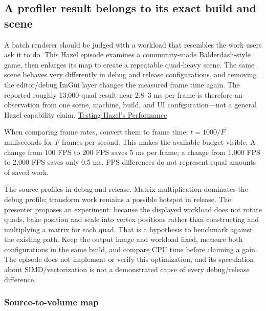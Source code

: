 \subsection{A profiler result belongs to its exact build and scene}\label{06-engine-ii-ch041-a-profiler-result-belongs-to-its-exact-build-and-scene}

\hypertarget{06-engine-ii-ch041-a-profiler-result-belongs-to-its-exact-build-and-scene}{}

A batch renderer should be judged with a workload that resembles the work users ask it to do. This Hazel episode examines a community-made Balderdash-style game, then enlarges its map to create a repeatable quad-heavy scene. The same scene behaves very differently in debug and release configurations, and removing the editor/debug ImGui layer changes the measured frame time again. The reported roughly 13,000-quad result near 2.8--3 ms per frame is therefore an observation from one scene, machine, build, and UI configuration---not a general Hazel capability claim. \href{https://www.youtube.com/watch?v=Yw7RpvmqvSE}{Testing Hazel's Performance}

When comparing frame rates, convert them to frame time: \(t=1000/F\) milliseconds for \(F\) frames per second. This makes the available budget visible. A change from 100 FPS to 200 FPS saves 5 ms per frame; a change from 1,000 FPS to 2,000 FPS saves only 0.5 ms. FPS differences do not represent equal amounts of saved work.

The source profiles  in debug and release. Matrix multiplication dominates the debug profile; transform work remains a possible hotspot in release. The presenter proposes an experiment: because the displayed workload does not rotate quads, bake position and scale into vertex positions rather than constructing and multiplying a matrix for each quad. That is a hypothesis to benchmark against the existing path. Keep the output image and workload fixed, measure both configurations in the same build, and compare CPU time before claiming a gain. The episode does not implement or verify this optimization, and its speculation about SIMD/vectorization is not a demonstrated cause of every debug/release difference.

\subsubsection{Source-to-volume map}\label{06-engine-ii-ch041-source-to-volume-map}

